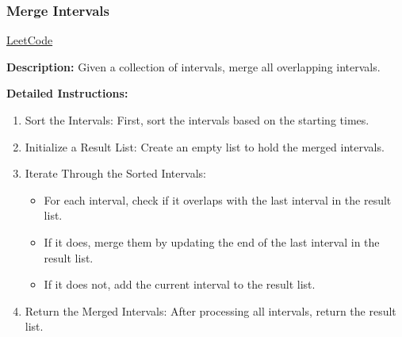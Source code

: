 \subsubsection{Merge Intervals}
\href{https://leetcode.com/problems/merge-intervals/}{LeetCode}

\textbf{Description:} Given a collection of intervals, merge all overlapping intervals.

\textbf{Detailed Instructions:}
\begin{enumerate}
    \item Sort the Intervals: First, sort the intervals based on the starting times.
    \item Initialize a Result List: Create an empty list to hold the merged intervals.
    \item Iterate Through the Sorted Intervals:
    \begin{itemize}
        \item For each interval, check if it overlaps with the last interval in the result list.
        \item If it does, merge them by updating the end of the last interval in the result list.
        \item If it does not, add the current interval to the result list.
    \end{itemize}
    \item Return the Merged Intervals: After processing all intervals, return the result list.
\end{enumerate}